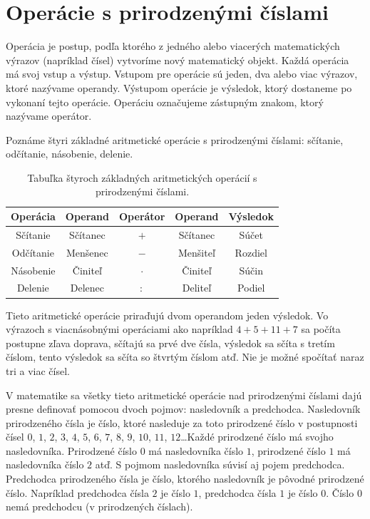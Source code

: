 \documentclass{article}
\begin{document}
\section{Operácie s prirodzenými číslami}

Operácia je postup, podľa ktorého z jedného alebo viacerých matematických výrazov (napríklad čísel) vytvoríme nový matematický objekt. Každá operácia má svoj vstup a výstup. Vstupom pre operácie sú jeden, dva alebo viac výrazov, ktoré nazývame operandy. Výstupom operácie je výsledok, ktorý dostaneme po vykonaní tejto operácie. Operáciu označujeme zástupným znakom, ktorý nazývame operátor.

Poznáme štyri základné aritmetické operácie s prirodzenými číslami: sčítanie, odčítanie, násobenie, delenie.

\begin{table}[H]
  \centering
  \renewcommand{\arraystretch}{1.3}
  \begin{tabular}{c|c|c|c|c}
    Operácia & Operand & Operátor & Operand & Výsledok \\
    \hline
    Sčítanie & Sčítanec & \(+\) & Sčítanec & Súčet \\
    Odčítanie & Menšenec & \(-\) & Menšiteľ & Rozdiel \\
    Násobenie & Činiteľ & \(\cdot\) & Činiteľ & Súčin \\
    Delenie & Delenec & \(:\) & Deliteľ & Podiel \\
  \end{tabular}
  \caption{Tabuľka štyroch základných aritmetických operácií s prirodzenými číslami.}
\end{table}

Tieto aritmetické operácie priraďujú dvom operandom jeden výsledok. Vo výrazoch s viacnásobnými operáciami ako napríklad \(4 + 5 + 11 + 7\) sa počíta postupne zľava doprava, sčítajú sa prvé dve čísla, výsledok sa sčíta s tretím číslom, tento výsledok sa sčíta so štvrtým číslom atď. Nie je možné spočítať naraz tri a viac čísel.

V matematike sa všetky tieto aritmetické operácie nad prirodzenými číslami dajú presne definovať pomocou dvoch pojmov: nasledovník a predchodca. Nasledovník prirodzeného čísla je číslo, ktoré nasleduje za toto prirodzené číslo v postupnosti čísel \(0\), \(1\), \(2\), \(3\), \(4\), \(5\), \(6\), \(7\), \(8\), \(9\), \(10\), \(11\), \(12\)\dots Každé prirodzené číslo má svojho nasledovníka. Prirodzené číslo \(0\) má nasledovníka číslo \(1\), prirodzené číslo \(1\) má nasledovníka číslo \(2\) atď. S pojmom nasledovníka súvisí aj pojem predchodca. Predchodca prirodzeného čísla je číslo, ktorého nasledovník je pôvodné prirodzené číslo. Napríklad predchodca čísla \(2\) je číslo \(1\), predchodca čísla \(1\) je číslo \(0\). Číslo \(0\) nemá predchodcu (v prirodzených číslach).
\end{document}

